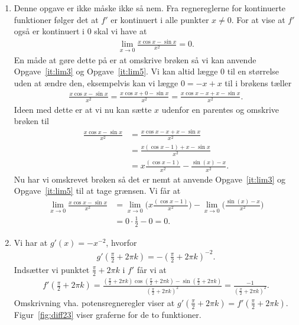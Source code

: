 \begin{enumerate}
	\item Denne opgave er ikke måske ikke så nem. Fra regnereglerne for kontinuerte funktioner følger det at $f'$ er kontinuert i alle punkter $x\neq 0$. For at vise at $f'$ også er kontinuert i $0$ skal vi have at 
	\begin{align*}
	\lim_{x\to 0} \frac{x\cos x-\sin x}{x^2}=0.
	\end{align*}
	En måde at gøre dette på er at omskrive brøken så vi kan anvende Opgave~\ref{it:lim3} og Opgave~\ref{it:lim5}. Vi kan altid lægge $0$ til en størrelse uden at ændre den, eksempelvis kan vi lægge $0=-x+x$ til i brøkens tæller
	\begin{align*}
	\frac{x\cos x-\sin x}{x^2}=\frac{x\cos x+0-\sin x}{x^2}=\frac{x\cos x-x+x-\sin x}{x^2}.
	\end{align*}
	Ideen med dette er at vi nu kan sætte $x$ udenfor en parentes og omskrive brøken til
	\begin{align*}
	\frac{x\cos x-\sin x}{x^2}&=\frac{x\cos x-x+x-\sin x}{x^2}\\
	&=\frac{x(\cos x-1)+x-\sin x}{x^2}\\
	&=x\frac{(\cos x-1)}{x^2}-\frac{\sin(x)-x}{x^2}.
	\end{align*}
	Nu har vi omskrevet brøken så det er nemt at anvende Opgave~\ref{it:lim3} og Opgave~\ref{it:lim5} til at tage grænsen. Vi får at
	\begin{align*}
	\lim_{x\to 0} \frac{x\cos x-\sin x}{x^2}&=\lim_{x\to 0}\Big(x\frac{(\cos x-1)}{x^2}\Big) -\lim_{x\to 0}\Big(\frac{\sin(x)-x}{x^2}\Big)\\&=0\cdot\frac{1}{2}-0=0.
	\end{align*}



	\item\label{it:diff23ans} Vi har at $g'(x)=-x^{-2}$, hvorfor
	\begin{align*}
	g'(\frac{\pi}{2}+2\pi k)=-(\frac{\pi}{2}+2\pi k)^{-2}.
	\end{align*}
	Indsætter vi punktet $ \frac{\pi}{2}+2\pi k $ i $f'$ får vi at
	\begin{align*}
	f'(\frac{\pi}{2}+2\pi k)=\frac{(\frac{\pi}{2}+2\pi k)\cos(\frac{\pi}{2}+2\pi k)-\sin (\frac{\pi}{2}+2\pi k)}{(\frac{\pi}{2}+2\pi k)^2}=\frac{-1}{(\frac{\pi}{2}+2\pi k)^2}.
	\end{align*}
	Omskrivning vha. potensregneregler viser at $g'(\frac{\pi}{2}+2\pi k)=f'(\frac{\pi}{2}+2\pi k)$. Figur~\ref{fig:diff23} viser graferne for de to funktioner.
	

\end{enumerate}
